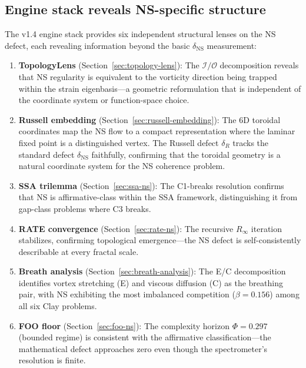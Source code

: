 \documentclass[11pt]{article}
\theoremstyle{definition}
\theoremstyle{remark}
\begin{document}
\subsection{Engine stack reveals NS-specific structure}

The v1.4 engine stack provides six independent structural lenses on the NS
defect, each revealing information beyond the basic $\delta_{\mathrm{NS}}$
measurement:

\begin{enumerate}[nosep]
  \item \textbf{TopologyLens} (Section~\ref{sec:topology-lens}): The
    $\mathcal{I}/\mathcal{O}$ decomposition reveals that NS regularity is
    equivalent to the vorticity direction being trapped within the strain
    eigenbasis---a geometric reformulation that is independent of the
    coordinate system or function-space choice.
  \item \textbf{Russell embedding} (Section~\ref{sec:russell-embedding}): The
    6D toroidal coordinates map the NS flow to a compact representation where
    the laminar fixed point is a distinguished vertex.  The Russell defect
    $\delta_R$ tracks the standard defect $\delta_{\mathrm{NS}}$ faithfully,
    confirming that the toroidal geometry is a natural coordinate system for
    the NS coherence problem.
  \item \textbf{SSA trilemma} (Section~\ref{sec:ssa-ns}): The C1-breaks
    resolution confirms that NS is affirmative-class within the SSA framework,
    distinguishing it from gap-class problems where C3 breaks.
  \item \textbf{RATE convergence} (Section~\ref{sec:rate-ns}): The recursive
    $R_\infty$ iteration stabilizes, confirming topological emergence---the
    NS defect is self-consistently describable at every fractal scale.
  \item \textbf{Breath analysis} (Section~\ref{sec:breath-analysis}): The
    E/C decomposition identifies vortex stretching (E) and viscous diffusion (C)
    as the breathing pair, with NS exhibiting the most imbalanced competition
    ($\beta = 0.156$) among all six Clay problems.
  \item \textbf{FOO floor} (Section~\ref{sec:foo-ns}): The complexity horizon
    $\Phi = 0.297$ (bounded regime) is consistent with the affirmative
    classification---the mathematical defect approaches zero even though the
    spectrometer's resolution is finite.
\end{enumerate}
\end{document}
